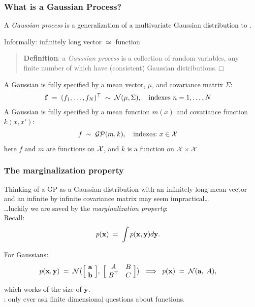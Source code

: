 \begin{frame}
\frametitle{What is a Gaussian Process?}

A \emph{Gaussian process} is a generalization of a multivariate Gaussian
distribution to .

Informally: infinitely long vector $\simeq$ function

\begin{quote}
{\bf Definition}: a \emph{Gaussian process} is a collection of random
variables, any finite number of which have (consistent) Gaussian
distributions.\hfill$\Box$
\end{quote}

A Gaussian  is fully specified by a mean vector, $\mu$, and
covariance matrix $\Sigma$:
\[
\mathbf f\;=\;(f_1,\ldots,f_N)^\top\;\sim\;{\cal N}(\mu,\Sigma),
\text{\ \ \ indexes\ } n=1,\ldots,N
\]
A Gaussian  is fully specified by a mean function $m(x)$ and
covariance function $k(x,x')$:
\[
f\;\sim\;{\cal GP}(m,k), \text{\ \ \ indexes:\ }x \in
{\cal X}
\]
here $f$ and $m$ are functions on ${\cal X}$, and $k$ is a function on
${\cal X} \times {\cal X}$
\end{frame}


\begin{frame}
\frametitle{The marginalization property}

Thinking of a GP as a Gaussian distribution with an infinitely long mean vector
and an infinite by infinite covariance matrix may seem impractical\ldots\\[1ex]

\ldots luckily we are saved by the \emph{marginalization property}:\\[1ex]

Recall:
\[
p(\mathbf x)\;=\;\int p(\mathbf x,\mathbf y)d\mathbf y.
\]

For Gaussians:
\[
p(\mathbf x,\mathbf y)\;=\;{\cal N}\big(\Big[\!\begin{array}{c}{\bf a} \\ {\bf b}
\end{array}\!\Big],
\;\Big[\!\begin{array}{cc}A & B \\ B^\top & C\end{array}\!\Big]\big)
\;\;\Longrightarrow\;\;p(\mathbf x)\;=\;{\cal N}({\bf a},\;A),
\]
which works  of the size of $\mathbf y$.\\[1ex]

: only ever ask finite dimensional questions about functions.

\end{frame}


